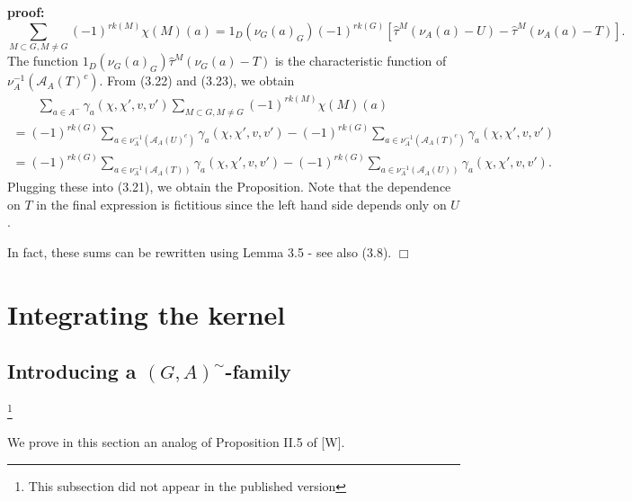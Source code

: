 \documentclass[12pt]{article}
\newenvironment{pf}[1][proof:]{\par\medskip\noindent\textbf{#1} }{\par\medskip}
\begin{document}
\begin{pf}
\begin{equation}\tag{3.23}
\sum_{M\subset G,M\neq G}(-1)^{rk(M)}\chi(M)(a)=1_D(\nu_G(a)_G)(-1)^{rk(G)}[\hat\tau^M(\nu_A(a)-U)-\hat\tau^M(\nu_A(a)-T)].
\end{equation}
The function $1_D(\nu_G(a)_G)\hat\tau^M(\nu_G(a)-T)$ is the characteristic function of $\nu_A^{-1}(\mathcal{A}_A(T)^c)$. From (3.22) and (3.23), we obtain
\[
\begin{array}{l}
\quad\quad\sum_{a\in A^-}\gamma_a(\chi,\chi',v,v')\sum_{M\subset G,M\neq G}(-1)^{rk(M)}\chi(M)(a)\\
=(-1)^{rk(G)}\sum_{a\in\nu_A^{-1}(\mathcal{A}_A(U)^c)}\gamma_a(\chi,\chi',v,v')-(-1)^{rk(G)}\sum_{a\in\nu_A^{-1}(\mathcal{A}_A(T)^c)}\gamma_a(\chi,\chi',v,v')\\
=(-1)^{rk(G)}\sum_{a\in\nu_A^{-1}(\mathcal{A}_A(T))}\gamma_a(\chi,\chi',v,v')-(-1)^{rk(G)}\sum_{a\in\nu_A^{-1}(\mathcal{A}_A(U))}\gamma_a(\chi,\chi',v,v').
\end{array}
\]
Plugging these into (3.21), we obtain the Proposition. Note that the dependence on $T$ in the final expression is fictitious since the left hand side depends only on $U$.

In fact, these sums can be rewritten using Lemma 3.5 - see also (3.8). $\Box$
\end{pf}

\section{Integrating the kernel}

\subsection{Introducing a $(G,A)^\sim$-family}
\footnote{This subsection did not appear in the published version}

We prove in this section an analog of Proposition II.5 of [W].
\end{document}
